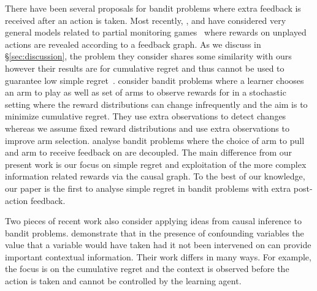 There have been several proposals for bandit problems where extra feedback is received after an action is taken.
Most recently, \citet{Alon2015}, \citet{Kocak2014} and \citet{wu2015online} have considered very general models related to partial monitoring games~\citep{Bartok2014} where rewards on unplayed actions are revealed according to a feedback graph. As we discuss in \S\ref{sec:discussion}, the problem they consider shares some similarity with ours however their results are for cumulative regret and thus cannot be used to guarantee low simple regret~\citep{Bubeck2009a}.
\citet{Yu2009} consider bandit problems where a learner chooses an arm to play as well as set of arms to observe rewards for in a stochastic setting where the reward distributions can change infrequently and the aim is to minimize cumulative regret.
They use extra observations to detect changes whereas we assume fixed reward distributions and use extra observations to improve arm selection.
\citet{Avner2012} analyse bandit problems where the choice of arm to pull and arm to receive feedback on are decoupled. 
The main difference from our present work is our focus on simple regret and exploitation of the more complex information related rewards via the causal graph.
To the best of our knowledge, our paper is the first to analyse simple regret in bandit problems with extra post-action feedback.



Two pieces of recent work also consider applying ideas from causal inference to bandit problems.
\citet{Bareinboim2015} demonstrate that in the presence of confounding variables the value that a variable would have taken had it not been 
intervened on can provide important contextual information. Their work differs in many ways. For example, the focus is on the cumulative regret and
the context is observed before the action is taken and cannot be controlled by the learning agent.  

